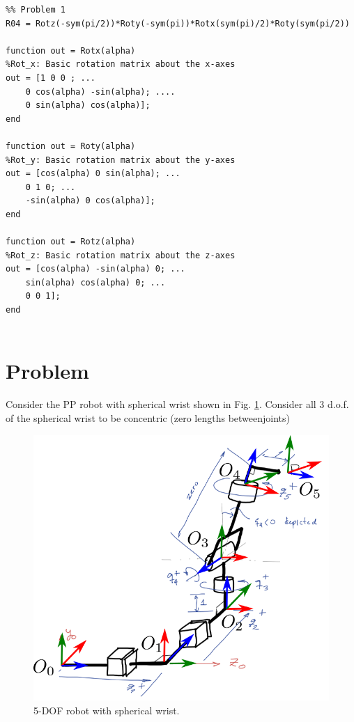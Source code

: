 \documentclass[a4paper,10pt]{article}
\begin{document}
\begin{lstlisting}
%% Problem 1
R04 = Rotz(-sym(pi/2))*Roty(-sym(pi))*Rotx(sym(pi)/2)*Roty(sym(pi/2))

function out = Rotx(alpha)
%Rot_x: Basic rotation matrix about the x-axes 
out = [1 0 0 ; ...
    0 cos(alpha) -sin(alpha); ....
    0 sin(alpha) cos(alpha)]; 
end

function out = Roty(alpha)
%Rot_y: Basic rotation matrix about the y-axes 
out = [cos(alpha) 0 sin(alpha); ...
    0 1 0; ...
    -sin(alpha) 0 cos(alpha)]; 
end

function out = Rotz(alpha)
%Rot_z: Basic rotation matrix about the z-axes 
out = [cos(alpha) -sin(alpha) 0; ...
    sin(alpha) cos(alpha) 0; ...
    0 0 1]; 
end


\end{lstlisting}

\section{Problem}

Consider the PP robot with spherical wrist shown in Fig. \ref{fig:5dof}. Consider all 3 d.o.f. of the spherical wrist to be concentric (zero lengths betweenjoints)


\begin{figure}[H] \label{fig:5dof}
 \centering
 \includegraphics[width=0.7\linewidth]{5DOF.png}
 \caption{5-DOF robot with spherical wrist.}
\end{figure}
\end{document}

